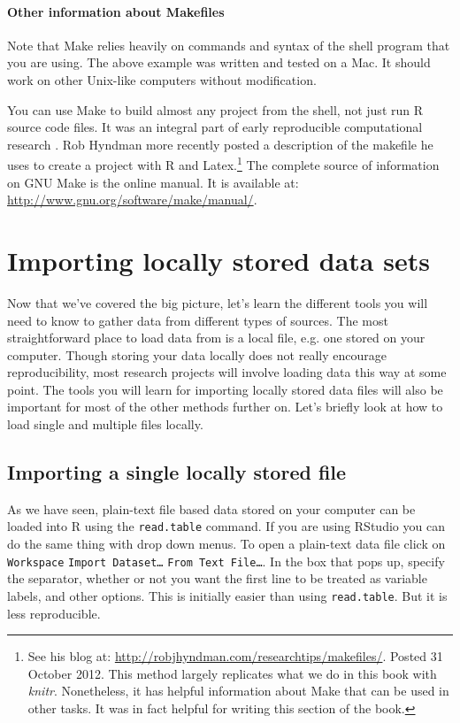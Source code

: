 \paragraph{Other information about Makefiles}

Note that Make relies heavily on commands and syntax of the shell program that you are using. The above example was written and tested on a Mac. It should work on other Unix-like computers without modification.

You can use Make to build almost any project from the shell, not just run R source code files. It was an integral part of early reproducible computational research \citep{Fomel2009, Buckheit1995}. Rob Hyndman more recently posted a description of the makefile he uses to create a project with R and Latex.\footnote{See his blog at: \url{http://robjhyndman.com/researchtips/makefiles/}. Posted 31 October 2012. This method largely replicates what we do in this book with \emph{knitr}. Nonetheless, it has helpful information about Make that can be used in other tasks. It was in fact helpful for writing this section of the book.} The complete source of information on GNU Make is the online manual. It is available at: \url{http://www.gnu.org/software/make/manual/}.

\section{Importing locally stored data sets}

Now that we've covered the big picture, let's learn the different tools you will need to know to gather data from different types of sources. The most straightforward place to load data from is a local file, e.g. one stored on your computer. Though storing your data locally does not really encourage reproducibility, most research projects will involve loading data this way at some point. The tools you will learn for importing locally stored data files will also be important for most of the other methods further on. Let's briefly look at how to load single and multiple files locally.

\subsection{Importing a single locally stored file}

As we have seen, plain-text file based data stored on your computer can be loaded into R using the \texttt{read.table} command. If you are using RStudio you can do the same thing with drop down menus. To open a plain-text data file click on \texttt{Workspace} \textrightarrow\: \texttt{Import Dataset\ldots} \textrightarrow\: \texttt{From Text File\ldots}. In the box that pops up, specify the separator, whether or not you want the first line to be treated as variable labels, and other options. This is initially easier than using \texttt{read.table}. But it is less reproducible.

